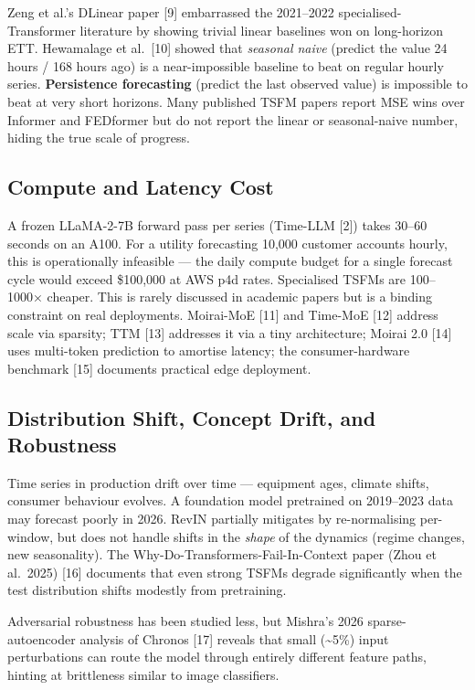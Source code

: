 Zeng et al.'s DLinear paper {[}9{]} embarrassed the 2021--2022 specialised-Transformer literature by showing trivial linear baselines won on long-horizon ETT. Hewamalage et al.~{[}10{]} showed that \emph{seasonal naive} (predict the value 24 hours / 168 hours ago) is a near-impossible baseline to beat on regular hourly series. \textbf{Persistence forecasting} (predict the last observed value) is impossible to beat at very short horizons. Many published TSFM papers report MSE wins over Informer and FEDformer but do not report the linear or seasonal-naive number, hiding the true scale of progress.

\subsection{Compute and Latency Cost}\label{compute-and-latency-cost}

A frozen LLaMA-2-7B forward pass per series (Time-LLM {[}2{]}) takes 30--60 seconds on an A100. For a utility forecasting 10,000 customer accounts hourly, this is operationally infeasible --- the daily compute budget for a single forecast cycle would exceed \$100,000 at AWS p4d rates. Specialised TSFMs are 100--1000× cheaper. This is rarely discussed in academic papers but is a binding constraint on real deployments. Moirai-MoE {[}11{]} and Time-MoE {[}12{]} address scale via sparsity; TTM {[}13{]} addresses it via a tiny architecture; Moirai 2.0 {[}14{]} uses multi-token prediction to amortise latency; the consumer-hardware benchmark {[}15{]} documents practical edge deployment.

\subsection{Distribution Shift, Concept Drift, and Robustness}\label{distribution-shift-concept-drift-and-robustness}

Time series in production drift over time --- equipment ages, climate shifts, consumer behaviour evolves. A foundation model pretrained on 2019--2023 data may forecast poorly in 2026. RevIN partially mitigates by re-normalising per-window, but does not handle shifts in the \emph{shape} of the dynamics (regime changes, new seasonality). The Why-Do-Transformers-Fail-In-Context paper (Zhou et al.~2025) {[}16{]} documents that even strong TSFMs degrade significantly when the test distribution shifts modestly from pretraining.

Adversarial robustness has been studied less, but Mishra's 2026 sparse-autoencoder analysis of Chronos {[}17{]} reveals that small (\textasciitilde5\%) input perturbations can route the model through entirely different feature paths, hinting at brittleness similar to image classifiers.

